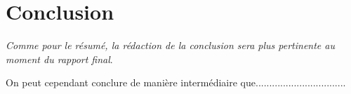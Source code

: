 \chapter{Conclusion}

\textit{Comme pour le résumé, la rédaction de la conclusion sera plus pertinente au moment du rapport final}.

On peut cependant conclure de manière intermédiaire que.................................








\vfil
\hspace{8cm}\makeatletter\@author\makeatother\par
\hspace{8cm}\begin{minipage}{5cm}
    \printsignature
\end{minipage}